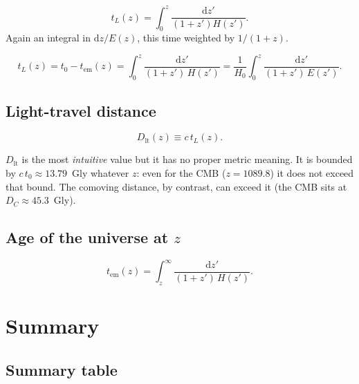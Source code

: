 \documentclass[11pt,a4paper,openany]{report}
\newcommand{\Hzero}{H_{0}}
\newcommand{\dif}{\mathrm{d}}
\newcommand{\eqdef}{\equiv}
\begin{document}
\begin{tcolorbox}[undergrad]
\[
t_L(z) = \int_{0}^{z}\frac{\dif z'}{(1+z')H(z')}.
\]
Again an integral in $\dif z/E(z)$, this time weighted by $1/(1+z)$.
\end{tcolorbox}

\begin{equation}
t_{L}(z) = t_{0} - t_{\text{em}}(z) = \int_{0}^{z}\frac{\dif z'}{(1+z')\,H(z')}
        = \frac{1}{\Hzero}\int_{0}^{z}\frac{\dif z'}{(1+z')\,E(z')}.
\label{eq:tlookback}
\end{equation}

\section{Light-travel distance}

\begin{equation}
D_{\text{lt}}(z) \eqdef c\,t_{L}(z).
\label{eq:Dlt}
\end{equation}

\begin{tcolorbox}[warning]
$D_{\text{lt}}$ is the most \emph{intuitive} value but it has no proper metric
meaning. It is bounded by $c\,t_{0}\approx 13.79$~Gly whatever $z$: even for the
CMB ($z=1089.8$) it does not exceed that bound. The comoving distance, by
contrast, can exceed it (the CMB sits at $D_C \approx 45.3$~Gly).
\end{tcolorbox}

\section{Age of the universe at $z$}

\begin{equation}
t_{\text{em}}(z) = \int_{z}^{\infty}\frac{\dif z'}{(1+z')\,H(z')}.
\label{eq:t_z}
\end{equation}

\chapter{Summary}

\section{Summary table}
\end{document}
